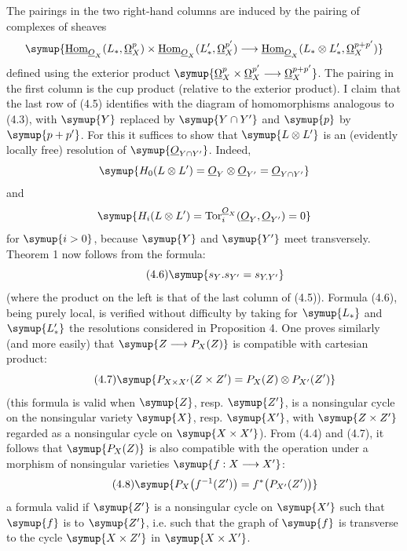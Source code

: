 The pairings in the two right-hand columns are induced by the pairing of
complexes of sheaves
\[
\symup{\Homsh_{\Osh_X}(L_{*},\underline{\Omega}_X^{p})
\times\Homsh_{\Osh_X}(L'_{*},\underline{\Omega}_X^{p'})
\longrightarrow
\Homsh_{\Osh_X}(L_{*}\otimes L'_{*},\underline{\Omega}_X^{p+p'})}
\]
defined using the exterior product
$\symup{\underline{\Omega}_X^{p}\times\underline{\Omega}_X^{p'}\longrightarrow\underline{\Omega}_X^{p+p'}}$.
The pairing in the first column is the cup product (relative to the exterior
product). I claim that the last row of (4.5) identifies with the diagram of
homomorphisms analogous to (4.3), with $\symup{Y}$ replaced by $\symup{Y\cap Y'}$ and $\symup{p}$ by
$\symup{p+p'}$. For this it suffices to show that $\symup{L\otimes L'}$ is an (evidently locally
free) resolution of $\symup{\Osh_{Y\cap Y'}}$. Indeed,
\[
  \symup{H_0(L\otimes L')=\Osh_Y\otimes\Osh_{Y'}=\Osh_{Y\cap Y'}}
\]
and
\[
  \symup{H_i(L\otimes L')=\operatorname{Tor}_{i}^{\Osh_X}(\Osh_Y,\Osh_{Y'})=0}
\]
for $\symup{i>0}$, because $\symup{Y}$ and $\symup{Y'}$ meet transversely. Theorem 1 now follows from the formula:
\begin{equation}\tag{4.6}
  \symup{s_Y.s_{Y'}=s_{Y.Y'}}
\end{equation}
(where the product on the left is that of the last column of (4.5)). Formula
(4.6), being purely local, is verified without difficulty by taking for $\symup{L_{*}}$
and $\symup{L'_{*}}$ the resolutions considered in Proposition 4. One proves similarly
(and more easily) that $\symup{Z\longrightarrow P_X(Z)}$ is compatible with cartesian
product:
\begin{equation}\tag{4.7}
  \symup{P_{X\times X'}(Z\times Z')=P_X(Z)\otimes P_{X'}(Z')}
\end{equation}
(this formula is valid when $\symup{Z}$, resp. $\symup{Z'}$, is a nonsingular cycle on
the nonsingular variety $\symup{X}$, resp. $\symup{X'}$, with $\symup{Z\times Z'}$ regarded as a
nonsingular cycle on $\symup{X\times X'}$). From (4.4) and (4.7), it follows that
$\symup{P_X(Z)}$ is also compatible with the operation  under a morphism of nonsingular
varieties $\symup{f:X\longrightarrow X'}$:
\begin{equation}\tag{4.8}
  \symup{P_X\bigl(f^{-1}(Z')\bigr)=f^{*}\bigl(P_{X'}(Z')\bigr)}
\end{equation}
a formula valid if $\symup{Z'}$ is a nonsingular cycle on $\symup{X'}$ such that $\symup{f}$ is  to $\symup{Z'}$, i.e. such that the graph of $\symup{f}$ is transverse to the cycle $\symup{X\times Z'}$ in $\symup{X\times X'}$.

